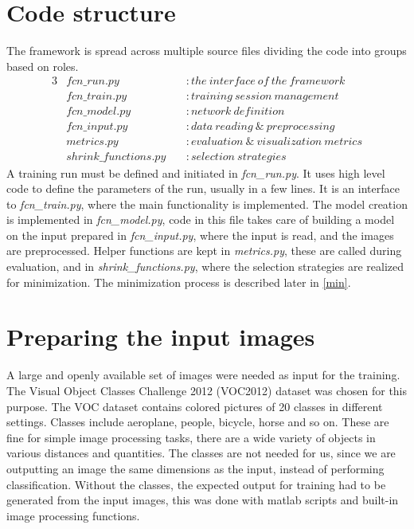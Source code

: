 \documentclass[12pt]{report}
\begin{document}
\section{Code structure}
The framework is spread across multiple source files dividing the code into groups based on roles.
\begin{alignat*}{3}
	&fcn\_run.py\          &&: the\ interface\ of\ the\ framework \\
	&fcn\_train.py\        &&: training\ session\ management \\
	&fcn\_model.py\        &&: network\ definition \\
	&fcn\_input.py\        &&: data\ reading\ \& \ preprocessing \\
	&metrics.py\           &&: evaluation\ \&\ visualization\ metrics \\
	&shrink\_functions.py\ &&: selection\ strategies
\end{alignat*}
A training run must be defined and initiated in \textit{fcn\_run.py}. It uses high level code to define the parameters of the run, usually in a few lines. It is an interface to \textit{fcn\_train.py}, where the main functionality is implemented. The model creation is implemented in \textit{fcn\_model.py}, code in this file takes care of building a model on the input prepared in \textit{fcn\_input.py}, where the input is read, and the images are preprocessed. Helper functions are kept in \textit{metrics.py}, these are called during evaluation, and in \textit{shrink\_functions.py}, where the selection strategies are realized for minimization. The minimization process is described later in \ref{min}.
\section{Preparing the input images}
A large and openly available set of images were needed as input for the training. The Visual Object Classes Challenge 2012 (VOC2012) dataset \cite{pascal-voc-2012} was chosen for this purpose. The VOC dataset contains colored pictures of 20 classes in different settings. Classes include aeroplane, people, bicycle, horse and so on. These are fine for simple image processing tasks, there are a wide variety of objects in various distances and quantities. The classes are not needed for us, since we are outputting an image the same dimensions as the input, instead of performing classification. Without the classes, the expected output for training had to be generated from the input images, this was done with matlab scripts and built-in image processing functions.
\end{document}
